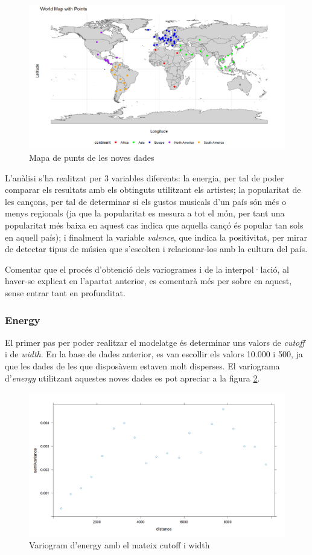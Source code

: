 \begin{figure}[H]
    \centering
    \includegraphics[width=0.5\linewidth]{Images//7_Geospatial//3_new/worldmap_points.png}
    \caption{Mapa de punts de les noves dades}
    \label{fig:geo_new_map}
\end{figure}

L'anàlisi s'ha realitzat per 3 variables diferents: la energia, per tal de poder comparar els resultats amb els obtinguts utilitzant els artistes; la popularitat de les cançons, per tal de determinar si els gustos musicals d'un país són més o menys regionals (ja que la popularitat es mesura a tot el món, per tant una popularitat més baixa en aquest cas indica que aquella cançó és popular tan sols en aquell país); i finalment la variable \textit{valence}, que indica la positivitat, per mirar de detectar tipus de música que s'escolten i relacionar-los amb la cultura del país.

Comentar que el procés d'obtenció dels variogrames i de la interpol·lació, al haver-se explicat en l'apartat anterior, es comentarà més per sobre en aquest, sense entrar tant en profunditat.

\subsubsection{Energy}

El primer pas per poder realitzar el modelatge és determinar uns valors de \textit{cutoff} i de \textit{width}. En la base de dades anterior, es van escollir els valors 10.000 i 500, ja que les dades de les que disposàvem estaven molt disperses. El variograma d'\textit{energy} utilitzant aquestes noves dades es pot apreciar a la figura \ref{fig:geo_new_energy_old}.

\begin{figure}[H]
    \centering
    \includegraphics[width=0.75\linewidth]{Images//7_Geospatial//3_new/energy_10000_500_variogram.png}
    \caption{Variogram d'energy amb el mateix cutoff i width}
    \label{fig:geo_new_energy_old}
\end{figure}

